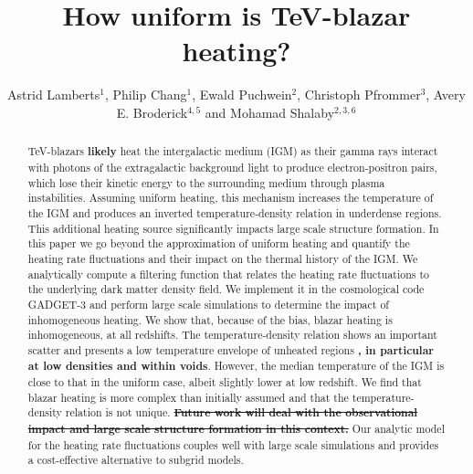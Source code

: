 \documentclass[twocolumns]{emulateapj}
\newcommand\Cc[1]{{\color{blue} \bf #1}} %
\newcommand\Ec[1]{{\color{magenta} \bf #1}} %
\begin{document}
\title{How uniform is TeV-blazar heating?}
\author{Astrid Lamberts$^1$, Philip Chang$^1$, Ewald Puchwein$^2$, Christoph Pfrommer$^3$, Avery E. Broderick$^{4,5}$ and Mohamad Shalaby$^{2,3,6}$}
\begin{abstract}
TeV-blazars \Ec{likely} heat the intergalactic medium (IGM) as their gamma rays interact with photons of the extragalactic background light to produce electron-positron pairs, which lose their kinetic energy to the surrounding medium through plasma instabilities. Assuming uniform heating, this mechanism increases the temperature of the IGM and produces an inverted temperature-density relation in underdense regions. This additional heating source significantly impacts large scale structure formation. In this paper we go beyond the approximation of uniform heating and quantify the heating rate fluctuations and their impact on the thermal history of the IGM. We analytically compute a filtering function that relates the heating rate fluctuations to the underlying dark matter density field. We implement it in the cosmological code GADGET-3 and perform large scale simulations to determine the impact of inhomogeneous heating. We show that, because of the bias, blazar heating is inhomogeneous, at all redshifts. The temperature-density relation shows an important scatter and presents a low temperature envelope of unheated regions\Cc{, in particular at low densities and within voids}. However, the median temperature of the IGM is close to that in the uniform case, albeit slightly lower at low redshift. We find that blazar heating is more complex than initially assumed and that the temperature-density relation is not unique. \Cc{\sout{Future work will deal with the observational impact and large scale structure formation in this context.}} Our analytic model for the heating rate fluctuations couples well with large scale simulations and provides a cost-effective alternative to subgrid models.
\end{abstract}
\end{document}
